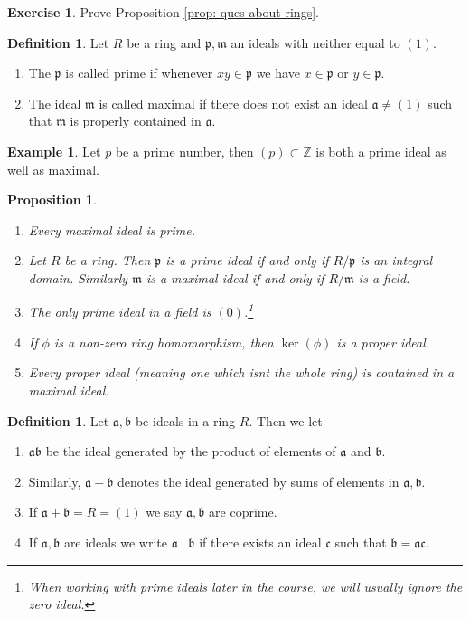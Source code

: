 \documentclass[11pt,a4paper]{report}
\theoremstyle{plain}
\newtheorem{prop}[subsection]{Proposition}
\theoremstyle{definition}
\newtheorem{definition}[subsection]{Definition}
\newtheorem{exmp}[subsection]{Example}
\theoremstyle{definition}
\newtheorem{question}[subsection]{Exercise}
\newcommand{\ZZ}{\mathbb{Z}}
\def\gothb{\mathfrak{b}}
\def\gothc{\mathfrak{c}}
\def\gothm{\mathfrak{m}}
\def\gothp{\mathfrak{p}}
\def\gotha{\mathfrak{a}}
\begin{document}
	\begin{question}
		Prove Proposition \ref{prop: ques about rings}.
	\end{question}
	
	\begin{definition}
		Let $R$ be a ring and $\gothp,\gothm$ an ideals with neither equal to  $(1)$. 
		\begin{enumerate}
			\item The $\gothp$ is called prime if whenever $xy \in \gothp$ we have $x \in \gothp$ or $y \in \gothp$.
			\item 	The ideal $\gothm$ is called maximal if there does not exist an ideal $\gotha \ne (1)$ such that $\gothm$ is properly contained in $\gotha$.
		\end{enumerate}
	\end{definition}
	
	\begin{exmp}
		Let $p$ be a prime number, then $(p) \subset \ZZ $ is both a prime ideal as well as maximal. 
	\end{exmp} 
	
	\begin{prop}\label{prop: prime and max ideals in rings}
		\begin{enumerate}
			\item Every maximal ideal is prime.
			\item Let $R$ be a ring. Then $\gothp$ is a prime ideal if and only if $R/\gothp$ is an integral domain. Similarly $\gothm$ is a maximal ideal if and only if $R/\gothm$ is a field.
			\item The only prime ideal in a field is $(0)$.\footnote{When working with prime ideals later in the course, we will usually ignore the zero ideal.}
			\item If $\phi$ is a non-zero ring homomorphism, then $\ker(\phi)$ is a proper ideal.
			\item Every proper ideal (meaning one which isnt the whole ring) is contained in a maximal ideal.
		\end{enumerate} 
	\end{prop}
	
	
	\begin{definition}
		Let $\gotha,\gothb$ be ideals in a ring $R$. Then we let 
		
		\begin{enumerate}
			\item $\gotha \gothb$ be the ideal generated by the product of elements of $\gotha$ and $\gothb$.
			\item Similarly, $\gotha+\gothb$ denotes the ideal generated by sums of elements in $\gotha,\gothb$.
			\item If $\gotha+\gothb=R=(1)$ we say $\gotha,\gothb$ are coprime.
			\item If $\gotha,\gothb$ are ideals we write $\gotha \mid \gothb$ if there exists an ideal $\gothc$ such that $\gothb=\gotha\gothc$.
			
		\end{enumerate}
	\end{definition}
	
\end{document}
